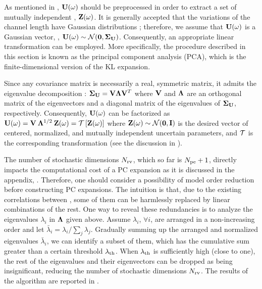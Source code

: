 As mentioned in , $\mathbf{U}(\omega)$ should be preprocessed in order to extract a set of mutually independent \rvs, $\mathbf{Z}(\omega)$. It is generally accepted that the variations of the channel length have Gaussian distributions \cite{juan2011, juan2012, srivastava2010}; therefore, we assume that $\mathbf{U}(\omega)$ is a Gaussian vector, \ie, $\vU(\o) \sim \normal(\vZero, \mCov_\vU)$. Consequently, an appropriate linear transformation can be employed. More specifically, the procedure described in this section is known as the principal component analysis (PCA), which is the finite-dimensional version of the KL expansion.

Since any covariance matrix is necessarily a real, symmetric matrix, it admits the eigenvalue decomposition \cite{press2007}: $\mCov_\vU = \m{V} \m{\Lambda} \m{V}^T$ where $\m{V}$ and $\m{\Lambda}$ are an orthogonal matrix of the eigenvectors and a diagonal matrix of the eigenvalues of $\mCov_\vU$, respectively. Consequently, $\mathbf{U}(\omega)$ can be factorized as $\vU(\o) = \m{V} \: \m{\Lambda}^{1/2} \: \vZ(\o) = \oTransform{\vZ(\o)}$ where $\vZ(\o) \sim \normal(\vZero, \mI)$ is the desired vector of centered, normalized, and mutually independent uncertain parameters, and $\oTransform$ is the corresponding transformation (see the discussion in ).

The number of stochastic dimensions ${N_\text{rv}}$, which so far is ${N_\text{pe}} + 1$, directly impacts the computational cost of a PC expansion as it is discussed in the appendix, . Therefore, one should consider a possibility of model order reduction before constructing PC expansions. The intuition is that, due to the existing correlations between \rvs, some of them can be harmlessly replaced by linear combinations of the rest. One way to reveal these redundancies is to analyze the eigenvalues $\lambda_i$ in $\m{\Lambda}$ given above. Assume $\lambda_i$, $\forall i$, are arranged in a non-increasing order and let $\bar{\lambda}_i = \lambda_i / \sum_j \lambda_j$. Gradually summing up the arranged and normalized eigenvalues $\bar{\lambda}_i$, we can identify a subset of them, which has the cumulative sum greater than a certain threshold $\lambda_\text{th}$. When $\lambda_\text{th}$ is sufficiently high (close to one), the rest of the eigenvalues and their eigenvectors can be dropped as being insignificant, reducing the number of stochastic dimensions ${N_\text{rv}}$. The results of the algorithm are reported in .
